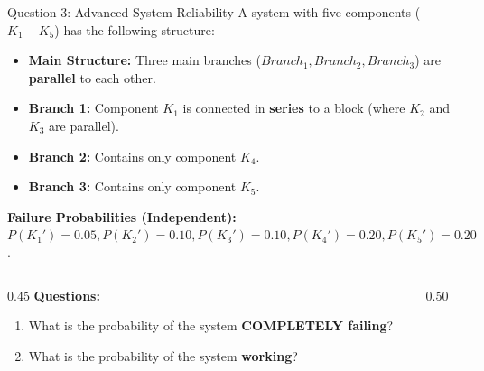 \documentclass[light]{lutbeamer}
\begin{document}
\begin{frame}{Question 3: Advanced System Reliability}
    \small
    A system with five components ($K_1 - K_5$) has the following structure:
    \begin{itemize}
        \item \textbf{Main Structure:} Three main branches ($Branch_1, Branch_2, Branch_3$) are \textbf{parallel} to each other.
        \item \textbf{Branch 1:} Component $K_1$ is connected in \textbf{series} to a block (where $K_2$ and $K_3$ are parallel).
        \item \textbf{Branch 2:} Contains only component $K_4$.
        \item \textbf{Branch 3:} Contains only component $K_5$.
    \end{itemize}

    \textbf{Failure Probabilities (Independent):}
    $P(K_1')=0.05, P(K_2')=0.10, P(K_3')=0.10, P(K_4')=0.20, P(K_5')=0.20$.

    \vspace{0.2cm}
    \begin{columns}[T]
        \begin{column}{0.45\textwidth}
            \textbf{Questions:}
            \begin{enumerate}
                \item[(a)] What is the probability of the system \textbf{COMPLETELY failing}?
                \item[(b)] What is the probability of the system \textbf{working}?
            \end{enumerate}
        \end{column}
        \begin{column}{0.50\textwidth}
            \centering
\end{column}
\end{columns}
\end{frame}
\end{document}
